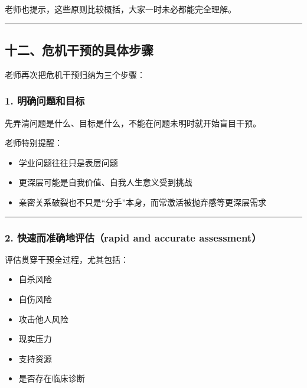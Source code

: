 \documentclass[
  chinese,
  9pt,
  a4paper,
]{ctexart}
\providecommand{\tightlist}{%
  \setlength{\itemsep}{0pt}\setlength{\parskip}{0pt}}
\begin{document}
老师也提示，这些原则比较概括，大家一时未必都能完全理解。

\begin{center}\rule{0.5\linewidth}{0.5pt}\end{center}

\subsection{十二、危机干预的具体步骤}\label{ux5341ux4e8cux5371ux673aux5e72ux9884ux7684ux5177ux4f53ux6b65ux9aa4}

老师再次把危机干预归纳为三个步骤：

\subsubsection{1.
明确问题和目标}\label{ux660eux786eux95eeux9898ux548cux76eeux6807}

先弄清问题是什么、目标是什么，不能在问题未明时就开始盲目干预。

老师特别提醒：

\begin{itemize}
\tightlist
\item
  学业问题往往只是表层问题
\item
  更深层可能是自我价值、自我人生意义受到挑战
\item
  亲密关系破裂也不只是``分手''本身，而常激活被抛弃感等更深层需求
\end{itemize}

\begin{center}\rule{0.5\linewidth}{0.5pt}\end{center}

\subsubsection{2. 快速而准确地评估（rapid and accurate
assessment）}\label{ux5febux901fux800cux51c6ux786eux5730ux8bc4ux4f30rapid-and-accurate-assessment}

评估贯穿干预全过程，尤其包括：

\begin{itemize}
\tightlist
\item
  自杀风险
\item
  自伤风险
\item
  攻击他人风险
\item
  现实压力
\item
  支持资源
\item
  是否存在临床诊断
\end{itemize}
\end{document}
